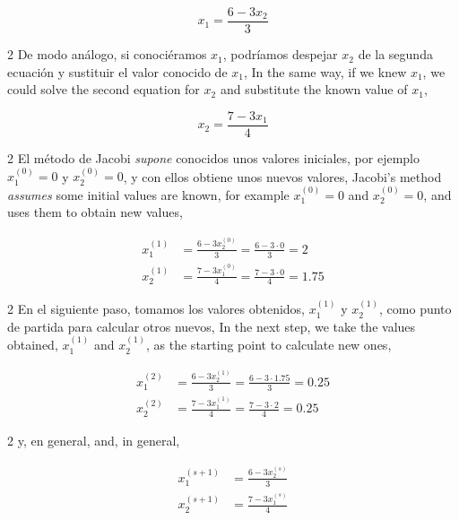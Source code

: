 \begin{equation*}
x_1=\frac{6-3x_2}{3}
\end{equation*}

\begin{paracol}{2}
De modo análogo, si conociéramos $x_1$, podríamos despejar $x_2$ de la segunda ecuación y sustituir el valor conocido de $x_1$,
\switchcolumn
In the same way, if we knew $x_1$, we could solve the second equation for $x_2$ and substitute the known value of $x_1$,
\end{paracol}

\begin{equation*}
x_2=\frac{7-3x_1}{4}
\end{equation*}

\begin{paracol}{2}
El método de Jacobi \emph{supone} conocidos unos valores iniciales, por ejemplo $x_1^{(0)}=0$ y $x_2^{(0)}=0$, y con ellos obtiene unos nuevos valores,
\switchcolumn
Jacobi's method \emph{assumes} some initial values are known, for example $x_1^{(0)}=0$ and $x_2^{(0)}=0$, and uses them to obtain new values,
\end{paracol}

\begin{align*}
x_1^{(1)}&=\frac{6-3x_2^{(0)}}{3}=\frac{6-3\cdot 0}{3}=2\\
x_2^{(1)}&=\frac{7-3x_1^{(0)}}{4}=\frac{7-3\cdot 0}{4}=1.75
\end{align*}

\begin{paracol}{2}
En el siguiente paso, tomamos los valores obtenidos, $x_1^{(1)}$ y $x_2^{(1)}$, como punto de partida para calcular otros nuevos,
\switchcolumn
In the next step, we take the values obtained, $x_1^{(1)}$ and $x_2^{(1)}$, as the starting point to calculate new ones,
\end{paracol}

\begin{align*}
x_1^{(2)}&=\frac{6-3x_2^{(1)}}{3}=\frac{6-3\cdot 1.75}{3}=0.25\\
x_2^{(2)}&=\frac{7-3x_1^{(1)}}{4}=\frac{7-3\cdot 2}{4}=0.25
\end{align*}

\begin{paracol}{2}
y, en general,
\switchcolumn
and, in general,
\end{paracol}

\begin{align*}
x_1^{(s+1)}&=\frac{6-3x_2^{(s)}}{3}\\
x_2^{(s+1)}&=\frac{7-3x_1^{(s)}}{4}
\end{align*}

